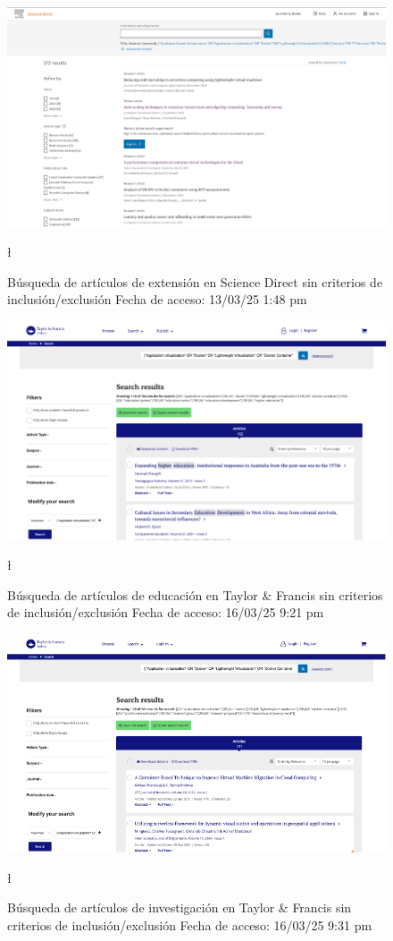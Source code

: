 \FloatBarrier\begin{figure}[H]
    \centering
    \includegraphics[width=\textwidth,keepaspectratio]{apendices/BD/sin-criterios/SD-ind.png}
    \caption{Búsqueda de artículos de extensión en Science Direct sin criterios de inclusión/exclusión
    Fecha de acceso: 13/03/25 1:48 pm}\l
\end{figure}
\FloatBarrier\begin{figure}[H]
    \centering
    \includegraphics[width=\textwidth,keepaspectratio]{apendices/BD/sin-criterios/TF-ed.png}
    \caption{Búsqueda de artículos de educación en Taylor \& Francis sin criterios de inclusión/exclusión
    Fecha de acceso: 16/03/25 9:21 pm}\l
\end{figure}
\FloatBarrier\begin{figure}[H]
    \centering
    \includegraphics[width=\textwidth,keepaspectratio]{apendices/BD/sin-criterios/TF-inv.png}
    \caption{Búsqueda de artículos de investigación en Taylor \& Francis sin criterios de inclusión/exclusión
    Fecha de acceso: 16/03/25 9:31 pm
    }\l
\end{figure}
